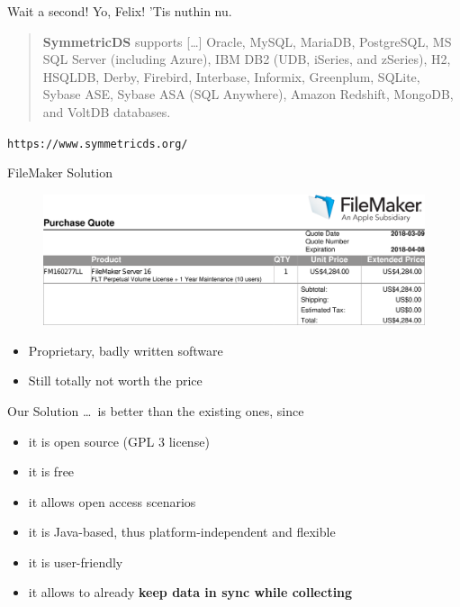 \documentclass[xcolor=x11names, aspectratio=169,usenames,dvipsnames]{beamer}
\begin{document}
\begin{frame}{Wait a second!}\large
Yo, Felix! 'Tis nuthin nu.\pause\bigskip

\normalsize

\begin{quote}
	\textbf{SymmetricDS} supports [\dots] \alert{Oracle}, \alert{MySQL}, MariaDB, \alert{PostgreSQL}, MS SQL Server (including Azure), IBM DB2 (UDB, iSeries, and zSeries), H2, HSQLDB, Derby, Firebird, Interbase, Informix, Greenplum, \alert{SQLite}, Sybase ASE, Sybase ASA (SQL Anywhere), Amazon Redshift, \alert{MongoDB}, and VoltDB databases.
\end{quote}\vspace{-1em}
\begin{flushright}
	\texttt{https://www.symmetricds.org/}
\end{flushright}
\end{frame}

\begin{frame}{FileMaker Solution}
\begin{figure}
\includegraphics[width=\linewidth]{img/order.png}
\end{figure}\vspace{-2em}
\begin{itemize}
\item Proprietary, badly written software
\item Still totally not worth the price
\end{itemize}
\end{frame}

\begin{frame}{Our Solution}\large
\dots\ is better than the existing ones, since

\begin{itemize}[<+->]
	\item it is \alert{open source} (GPL 3 license)
	\item it is free
	\item it allows \alert{open access} scenarios
	\item it is Java-based, thus \alert{platform-independent} and flexible
	\item it is user-friendly
	\item it allows to already \textbf{\alert{keep data in sync} while collecting}
\end{itemize}
\end{frame}
\end{document}
